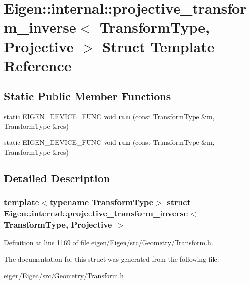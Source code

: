 \hypertarget{struct_eigen_1_1internal_1_1projective__transform__inverse_3_01_transform_type_00_01_projective_01_4}{}\section{Eigen\+:\+:internal\+:\+:projective\+\_\+transform\+\_\+inverse$<$ Transform\+Type, Projective $>$ Struct Template Reference}
\label{struct_eigen_1_1internal_1_1projective__transform__inverse_3_01_transform_type_00_01_projective_01_4}
\subsection*{Static Public Member Functions}
\begin{DoxyCompactItemize}
\item 
\mbox{\label{struct_eigen_1_1internal_1_1projective__transform__inverse_3_01_transform_type_00_01_projective_01_4_ad57fa380b8eecc66ee5005d22f3fe306}} 
static E\+I\+G\+E\+N\+\_\+\+D\+E\+V\+I\+C\+E\+\_\+\+F\+U\+NC void {\bfseries run} (const Transform\+Type \&m, Transform\+Type \&res)
\item 
\mbox{\label{struct_eigen_1_1internal_1_1projective__transform__inverse_3_01_transform_type_00_01_projective_01_4_ad57fa380b8eecc66ee5005d22f3fe306}} 
static E\+I\+G\+E\+N\+\_\+\+D\+E\+V\+I\+C\+E\+\_\+\+F\+U\+NC void {\bfseries run} (const Transform\+Type \&m, Transform\+Type \&res)
\end{DoxyCompactItemize}


\subsection{Detailed Description}
\subsubsection*{template$<$typename Transform\+Type$>$\newline
struct Eigen\+::internal\+::projective\+\_\+transform\+\_\+inverse$<$ Transform\+Type, Projective $>$}



Definition at line \hyperlink{eigen_2_eigen_2src_2_geometry_2_transform_8h_source_l01169}{1169} of file \hyperlink{eigen_2_eigen_2src_2_geometry_2_transform_8h_source}{eigen/\+Eigen/src/\+Geometry/\+Transform.\+h}.



The documentation for this struct was generated from the following file\+:\begin{DoxyCompactItemize}
\item 
eigen/\+Eigen/src/\+Geometry/\+Transform.\+h\end{DoxyCompactItemize}
